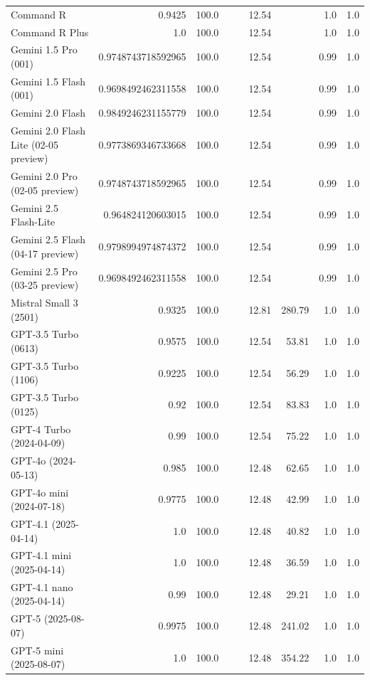 \begin{table}[htp]
{\begin{tabular}{lrrrrrrrr}
Command R & 0.9425 & 100.0 &  &  & 12.54 &  & 1.0 & 1.0 \\
Command R Plus & 1.0 & 100.0 &  &  & 12.54 &  & 1.0 & 1.0 \\
Gemini 1.5 Pro (001) & 0.9748743718592965 & 100.0 &  &  & 12.54 &  & 0.99 & 1.0 \\
Gemini 1.5 Flash (001) & 0.9698492462311558 & 100.0 &  &  & 12.54 &  & 0.99 & 1.0 \\
Gemini 2.0 Flash & 0.9849246231155779 & 100.0 &  &  & 12.54 &  & 0.99 & 1.0 \\
Gemini 2.0 Flash Lite (02-05 preview) & 0.9773869346733668 & 100.0 &  &  & 12.54 &  & 0.99 & 1.0 \\
Gemini 2.0 Pro (02-05 preview) & 0.9748743718592965 & 100.0 &  &  & 12.54 &  & 0.99 & 1.0 \\
Gemini 2.5 Flash-Lite & 0.964824120603015 & 100.0 &  &  & 12.54 &  & 0.99 & 1.0 \\
Gemini 2.5 Flash (04-17 preview) & 0.9798994974874372 & 100.0 &  &  & 12.54 &  & 0.99 & 1.0 \\
Gemini 2.5 Pro (03-25 preview) & 0.9698492462311558 & 100.0 &  &  & 12.54 &  & 0.99 & 1.0 \\
Mistral Small 3 (2501) & 0.9325 & 100.0 &  &  & 12.81 & 280.79 & 1.0 & 1.0 \\
GPT-3.5 Turbo (0613) & 0.9575 & 100.0 &  &  & 12.54 & 53.81 & 1.0 & 1.0 \\
GPT-3.5 Turbo (1106) & 0.9225 & 100.0 &  &  & 12.54 & 56.29 & 1.0 & 1.0 \\
GPT-3.5 Turbo (0125) & 0.92 & 100.0 &  &  & 12.54 & 83.83 & 1.0 & 1.0 \\
GPT-4 Turbo (2024-04-09) & 0.99 & 100.0 &  &  & 12.54 & 75.22 & 1.0 & 1.0 \\
GPT-4o (2024-05-13) & 0.985 & 100.0 &  &  & 12.48 & 62.65 & 1.0 & 1.0 \\
GPT-4o mini (2024-07-18) & 0.9775 & 100.0 &  &  & 12.48 & 42.99 & 1.0 & 1.0 \\
GPT-4.1 (2025-04-14) & 1.0 & 100.0 &  &  & 12.48 & 40.82 & 1.0 & 1.0 \\
GPT-4.1 mini (2025-04-14) & 1.0 & 100.0 &  &  & 12.48 & 36.59 & 1.0 & 1.0 \\
GPT-4.1 nano (2025-04-14) & 0.99 & 100.0 &  &  & 12.48 & 29.21 & 1.0 & 1.0 \\
GPT-5 (2025-08-07) & 0.9975 & 100.0 &  &  & 12.48 & 241.02 & 1.0 & 1.0 \\
GPT-5 mini (2025-08-07) & 1.0 & 100.0 &  &  & 12.48 & 354.22 & 1.0 & 1.0 \\

\end{tabular}}
\end{table}
